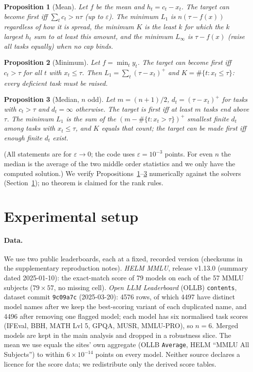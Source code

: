 \documentclass{article}
\newtheorem{proposition}{Proposition}
\begin{document}
\begin{proposition}[Mean]\label{prop:mean}
Let $f$ be the mean and $h_t=c_t-x_t$. The target can become first iff $\sum_t c_t> n\tau$ (up to $\varepsilon$). The minimum $L_1$ is $n(\tau-f(x))$ regardless of how it is spread, the minimum $K$ is the least $k$ for which the $k$ largest $h_t$ sum to at least this amount, and the minimum $L_\infty$ is $\tau-f(x)$ (raise all tasks equally) when no cap binds.
\end{proposition}
\begin{proposition}[Minimum]\label{prop:min}
Let $f=\min_t y_t$. The target can become first iff $c_t>\tau$ for all $t$ with $x_t\le\tau$. Then $L_1=\sum_t(\tau-x_t)^+$ and $K=\#\{t:x_t\le\tau\}$: every deficient task must be raised.
\end{proposition}
\begin{proposition}[Median, $n$ odd]\label{prop:median}
Let $m=(n+1)/2$, $d_t=(\tau-x_t)^+$ for tasks with $c_t>\tau$ and $d_t=\infty$ otherwise. The target is first iff at least $m$ tasks end above $\tau$. The minimum $L_1$ is the sum of the $(m-\#\{t:x_t>\tau\})^+$ smallest finite $d_t$ among tasks with $x_t\le\tau$, and $K$ equals that count; the target can be made first iff enough finite $d_t$ exist.
\end{proposition}
(All statements are for $\varepsilon\to0$; the code uses $\varepsilon=10^{-3}$ points. For even $n$ the median is the average of the two middle order statistics and we only have the computed solution.) We verify Propositions~\ref{prop:mean}--\ref{prop:median} numerically against the solvers (Section~\ref{sec:exp}); no theorem is claimed for the rank rules.

\section{Experimental setup}
\label{sec:exp}
\paragraph{Data.}
We use two public leaderboards, each at a fixed, recorded version (checksums in the supplementary reproduction notes). \emph{HELM MMLU}, release v1.13.0 (summary dated 2025-01-10): the exact-match score of 79 models on each of the 57 MMLU subjects ($79\times57$, no missing cell). \emph{Open LLM Leaderboard} (OLLB) \texttt{contents}, dataset commit \texttt{9c09a7c} (2025-03-20): 4576 rows, of which 4497 have distinct model names after we keep the best-scoring variant of each duplicated name, and 4496 after removing one flagged model; each model has six normalised task scores (IFEval, BBH, MATH Lvl 5, GPQA, MUSR, MMLU-PRO), so $n=6$. Merged models are kept in the main analysis and dropped in a robustness slice. The mean we use equals the sites' own aggregate (OLLB \texttt{Average}, HELM ``MMLU All Subjects'') to within $6\times10^{-14}$ points on every model. Neither source declares a licence for the score data; we redistribute only the derived score tables.
\end{document}

